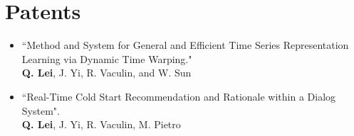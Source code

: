 \documentclass[margin, 10pt]{res} %
\begin{document}
\begin{resume}
\begin{enumerate}
\end{enumerate} 






\section{Patents}\begin{itemize}
	\item{``Method and System for General and Efficient Time Series Representation 
		Learning via Dynamic Time Warping."\\
		\textbf{Q. Lei}, J. Yi, R. Vaculin, and W. Sun}
	
	\item{``Real-Time Cold Start Recommendation and Rationale within a Dialog System".\\
		\textbf{Q. Lei}, J. Yi, R. Vaculin, M. Pietro}
\end{itemize}
\begin{comment}

\end{comment}
\end{resume}
\end{document}
